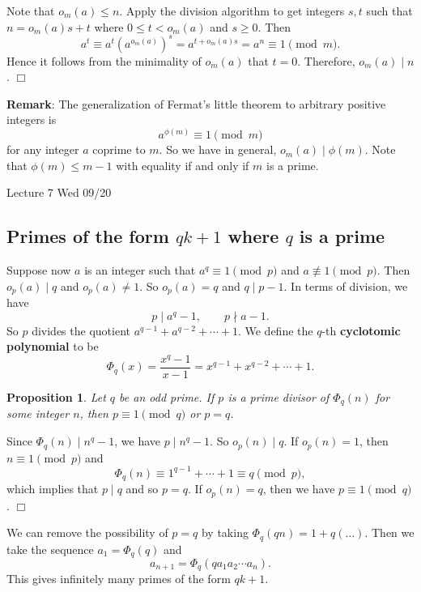\documentclass{article}
\newtheorem{proposition}[subsection]{Proposition}
\newenvironment{proof}{\noindent {\bf Proof:}}{$\Box$ \vspace{2 ex}}
\newcommand{\add}[1]{{\color{blue} #1}}
\begin{document}
\begin{proof}
    Note that $o_m(a)\leq n$. Apply the division algorithm to get integers $s,t$ such that $n = o_m(a)s + t$ where $0\leq t < o_m(a)$ and $s\geq 0$. Then
$$a^t \equiv a^t (a^{o_m(a)})^s = a^{t + o_m(a)s} = a^{n}\equiv 1\pmod{m}.$$
Hence it follows from the minimality of $o_m(a)$ that $t = 0$. Therefore, $o_m(a)\mid n$.
\end{proof}

\noindent\textbf{Remark}: The generalization of Fermat's little theorem to arbitrary positive integers is $$a^{\phi(m)}\equiv 1\pmod{m}$$
for any integer $a$ coprime to $m$. So we have in general, $o_m(a)\mid \phi(m)$. Note that $\phi(m) \leq m - 1$ with equality if and only if $m$ is a prime.
\begin{center}
    \add{Lecture 7 Wed 09/20}
\end{center}

\subsection*{Primes of the form $qk+1$ where $q$ is a prime}

Suppose now $a$ is an integer such that $a^q\equiv 1\pmod{p}$ and $a\not\equiv 1\pmod{p}$. Then $o_p(a)\mid q$ and $o_p(a)\neq 1$. So $o_p(a)=q$ and $q\mid p-1$. In terms of division, we have
$$p\mid a^q - 1,\qquad p\nmid a - 1.$$
So $p$ divides the quotient $a^{q-1} + a^{q-2} + \cdots + 1$. We define the $q$-th \textbf{cyclotomic polynomial} to be
$$\Phi_q(x) = \frac{x^q - 1}{x - 1} = x^{q-1} + x^{q-2} + \cdots + 1.$$

\begin{proposition}
    Let $q$ be an odd prime. If $p$ is a prime divisor of $\Phi_q(n)$ for some integer $n$, then $p\equiv 1\pmod{q}$ or $p=q$.
\end{proposition}


\begin{proof}
    Since $\Phi_q(n)\mid n^q - 1$, we have $p\mid n^q - 1$. So $o_p(n)\mid q$. If $o_p(n) = 1$, then $n\equiv 1\pmod{p}$ and $$\Phi_q(n) \equiv 1^{q-1} + \cdots + 1 \equiv q\pmod{p},$$
    which implies that $p\mid q$ and so $p=q$. If $o_p(n) = q$, then we have $p\equiv 1\pmod{q}$.
\end{proof}

We can remove the possibility of $p=q$ by taking $\Phi_q(qn) = 1 + q(\ldots).$ Then we take the sequence $a_1 = \Phi_q(q)$ and $$a_{n+1} = \Phi_q(qa_1a_2\cdots a_n).$$
This gives infinitely many primes of the form $qk+1$.
\end{document}
